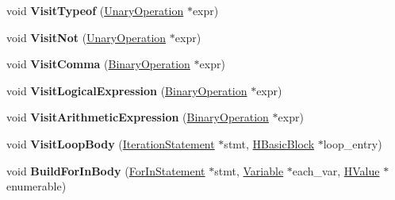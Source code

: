 \begin{DoxyCompactItemize}
\item 
void {\bfseries Visit\+Typeof} (\hyperlink{classv8_1_1internal_1_1_unary_operation}{Unary\+Operation} $\ast$expr)\hypertarget{classv8_1_1internal_1_1_h_optimized_graph_builder_aed9ce86153dcd97637ef498ba05d924a}{}\label{classv8_1_1internal_1_1_h_optimized_graph_builder_aed9ce86153dcd97637ef498ba05d924a}

\item 
void {\bfseries Visit\+Not} (\hyperlink{classv8_1_1internal_1_1_unary_operation}{Unary\+Operation} $\ast$expr)\hypertarget{classv8_1_1internal_1_1_h_optimized_graph_builder_a1a3195ea42cd5549d5aa5a7954b2dff4}{}\label{classv8_1_1internal_1_1_h_optimized_graph_builder_a1a3195ea42cd5549d5aa5a7954b2dff4}

\item 
void {\bfseries Visit\+Comma} (\hyperlink{classv8_1_1internal_1_1_binary_operation}{Binary\+Operation} $\ast$expr)\hypertarget{classv8_1_1internal_1_1_h_optimized_graph_builder_a28367dd40feeb1cfb77b3cd3371ed133}{}\label{classv8_1_1internal_1_1_h_optimized_graph_builder_a28367dd40feeb1cfb77b3cd3371ed133}

\item 
void {\bfseries Visit\+Logical\+Expression} (\hyperlink{classv8_1_1internal_1_1_binary_operation}{Binary\+Operation} $\ast$expr)\hypertarget{classv8_1_1internal_1_1_h_optimized_graph_builder_ab59437bcd84ea97b0385af711bede24a}{}\label{classv8_1_1internal_1_1_h_optimized_graph_builder_ab59437bcd84ea97b0385af711bede24a}

\item 
void {\bfseries Visit\+Arithmetic\+Expression} (\hyperlink{classv8_1_1internal_1_1_binary_operation}{Binary\+Operation} $\ast$expr)\hypertarget{classv8_1_1internal_1_1_h_optimized_graph_builder_a9ddefb168b57344a8c97e8dedaaf2874}{}\label{classv8_1_1internal_1_1_h_optimized_graph_builder_a9ddefb168b57344a8c97e8dedaaf2874}

\item 
void {\bfseries Visit\+Loop\+Body} (\hyperlink{classv8_1_1internal_1_1_iteration_statement}{Iteration\+Statement} $\ast$stmt, \hyperlink{classv8_1_1internal_1_1_h_basic_block}{H\+Basic\+Block} $\ast$loop\+\_\+entry)\hypertarget{classv8_1_1internal_1_1_h_optimized_graph_builder_adab2bc33ce9f240bdf539926048bd910}{}\label{classv8_1_1internal_1_1_h_optimized_graph_builder_adab2bc33ce9f240bdf539926048bd910}

\item 
void {\bfseries Build\+For\+In\+Body} (\hyperlink{classv8_1_1internal_1_1_for_in_statement}{For\+In\+Statement} $\ast$stmt, \hyperlink{classv8_1_1internal_1_1_variable}{Variable} $\ast$each\+\_\+var, \hyperlink{classv8_1_1internal_1_1_h_value}{H\+Value} $\ast$enumerable)\hypertarget{classv8_1_1internal_1_1_h_optimized_graph_builder_a1f90f003832059290b8b4e1c3106cbf1}{}\label{classv8_1_1internal_1_1_h_optimized_graph_builder_a1f90f003832059290b8b4e1c3106cbf1}


\end{DoxyCompactItemize}

